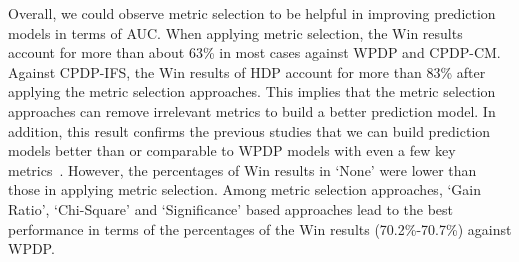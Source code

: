 Overall, we could observe metric selection to be helpful in improving
prediction models in terms of AUC. When applying metric selection, the Win results
account for more than about 63\% in most cases against WPDP and CPDP-CM. Against
CPDP-IFS, the Win results of HDP account for more than 83\% after applying the
metric selection approaches. This implies that the metric selection approaches
can remove irrelevant metrics to build a better prediction model. In addition, this result confirms
the previous studies that we can build prediction models better than or
comparable to WPDP models with even a few key metrics~\cite{Gao11, He14subset}.
However, the percentages of Win results in `None' were lower than those in
applying metric selection. Among metric selection approaches, `Gain Ratio', `Chi-Square' and
`Significance' based approaches lead to the best performance in terms of the
percentages of the Win results (70.2\%-70.7\%) against WPDP.

